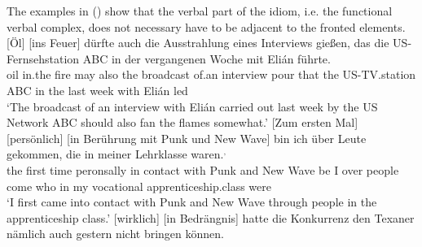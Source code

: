 \zl
%
%
The examples in () show that the verbal part of the idiom, i.e. the functional verbal complex,
does not necessary have to be adjacent to the fronted elements.
\eal
\label{bsp-idioms-nicht-adjazent}
\ex 
\gll {}[Öl] [ins Feuer] dürfte auch die Ausstrahlung eines Interviews gießen, das die US-Fernsehstation ABC in der vergangenen Woche mit Elián führte.\label{bsp-oel-ins-feuer-duerfte}\footnotemark\\
     \spacebr{}oil \spacebr{}in.the fire may also the broadcast of.an interview pour that the US-TV.station ABC in the last week with Elián led\\
\glt `The broadcast of an interview with Elián carried out last week by the US Network ABC should also fan the flames somewhat.'
\ex{}\label{bsp-zum-ersten-mal-mit-punk}
\gll {}[Zum ersten Mal] [persönlich] [in Berührung mit Punk und New Wave] bin ich über Leute gekommen, die in meiner Lehrklasse waren.\label{bsp-zum-ersten-mal-persoenlich-in-beruehrung-bin-ich-gekommen}\footnotemark$^,$\footnotemark\\
	   \spacebr{}the first time \spacebr{}peronsally \spacebr{}in contact with Punk and New Wave be I over people come who in my vocational apprenticeship.class were\\
\glt `I first came into contact with Punk and New Wave through people in the apprenticeship class.'
\ex\label{wirklich-in-bed} 
\gll {}[wirklich] [in Bedrängnis] hatte die Konkurrenz den Texaner nämlich auch gestern nicht bringen können.\footnotemark\\
